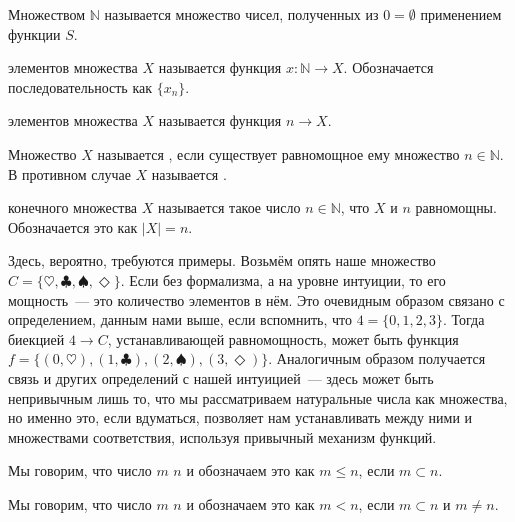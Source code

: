 \begin{definition}
Множеством  $\mathbb{N}$ называется множество чисел, полученных из $0=\emptyset$ применением функции $S$.
\end{definition}

\begin{definition}
 элементов множества $X$ называется функция $x:\mathbb{N}\to X$. Обозначается последовательность как $\{x_n\}$.
\end{definition}

\begin{definition}
 элементов множества $X$ называется функция $n \to X$.
\end{definition}

\begin{definition}
Множество $X$ называется , если существует равномощное ему множество $n\in\mathbb{N}$. В противном случае $X$ называется .
\end{definition}

\begin{definition}
 конечного множества $X$ называется такое число $n\in \mathbb{N}$, что $X$ и $n$ равномощны. Обозначается это как $|X| = n$.
\end{definition}

Здесь, вероятно, требуются примеры. Возьмём опять наше множество $C=\{\heartsuit, \clubsuit, \spadesuit, \Diamond\}$. Если без формализма, а на уровне интуиции, то его мощность~— это количество элементов в нём. Это очевидным образом связано с определением, данным нами выше, если вспомнить, что $4 = \{0, 1, 2, 3\}$. Тогда биекцией $4\to C$, устанавливающей равномощность, может быть функция $f = \{(0, \heartsuit), (1, \clubsuit), (2, \spadesuit), (3, \Diamond)\}$. Аналогичным образом получается связь и других определений с нашей интуицией~— здесь может быть непривычным лишь то, что мы рассматриваем натуральные числа как множества, но именно это, если вдуматься, позволяет нам устанавливать между ними и множествами соответствия, используя привычный механизм функций.

\begin{definition}
Мы говорим, что число $m$  $n$ и обозначаем это как $m\le n$, если $m\subset n$.
\end{definition}

\begin{definition}
Мы говорим, что число $m$  $n$ и обозначаем это как $m<n$, если $m\subset n$ и $m \not= n$.
\end{definition}

